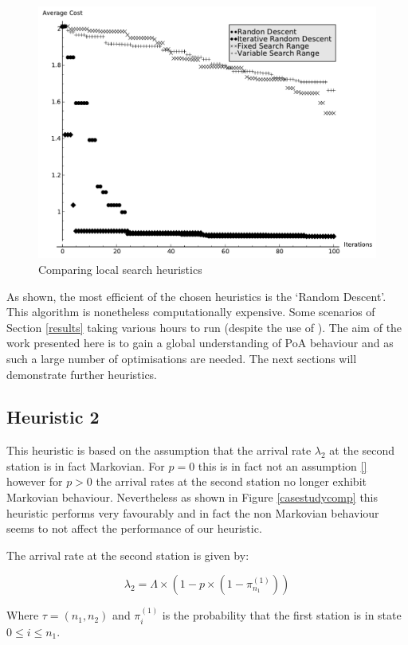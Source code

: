 \documentclass[12pt]{article}
\begin{document}
\begin{figure}[!hbtp]
    \begin{center}
        \includegraphics[width=.6\textwidth]{Images/Solver_Comp.pdf}
    \end{center}
    \caption{Comparing local search heuristics}\label{basicsearch}
\end{figure}

As shown, the most efficient of the chosen heuristics is the `Random Descent'.
This algorithm is nonetheless computationally expensive.
Some scenarios of Section \ref{results} taking various hours to run (despite the use of \cite{web002}).
The aim of the work presented here is to gain a global understanding of PoA behaviour and as such a large number of optimisations are needed.
The next sections will demonstrate further heuristics.

\subsection{Heuristic 2}\label{heuristic2}

This heuristic is based on the assumption that the arrival rate $\lambda_2$ at the second station is in fact Markovian.
For $p=0$ this is in fact not an assumption \ref{} however for $p>0$ the arrival rates at the second station no longer exhibit Markovian behaviour.
Nevertheless as shown in Figure \ref{casestudycomp} this heuristic performs very favourably and in fact the non Markovian behaviour seems to not affect the performance of our heuristic.

The arrival rate at the second station is given by:

\begin{equation}\label{lmbda2rate}
\lambda_2 = \Lambda\times(1-p\times(1-\pi^{(1)}_{n_1}))
\end{equation}

Where $\tau=(n_1, n_2)$ and $\pi^{(1)}_{i}$ is the probability that the first station is in state $0\leq i\leq n_1$.
\end{document}
